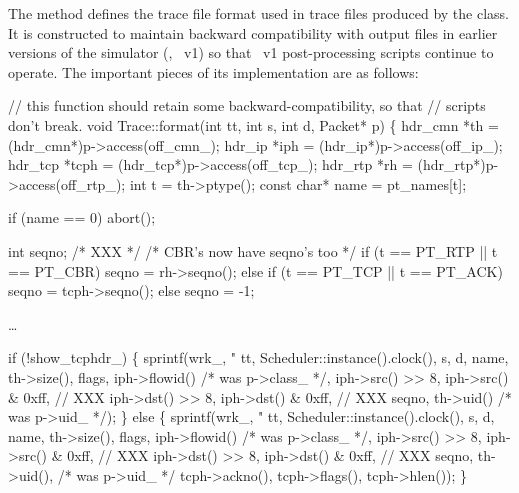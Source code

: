 The  method defines the trace file format used
in trace files produced by the  class.
It is constructed to maintain backward compatibility with output files
in earlier versions of the simulator (\ie, \ns~v1) so that \ns~v1
post-processing scripts continue to operate.
The important pieces of its implementation are as follows:
\begin{program}
        // {\cf this function should retain some backward-compatibility, so that}
        // {\cf scripts don't break.}
        void Trace::format(int tt, int s, int d, Packet* p)
        \{
                hdr_cmn *th = (hdr_cmn*)p->access(off_cmn_);
                hdr_ip *iph = (hdr_ip*)p->access(off_ip_);
                hdr_tcp *tcph = (hdr_tcp*)p->access(off_tcp_);
                hdr_rtp *rh = (hdr_rtp*)p->access(off_rtp_);
                int t = th->ptype();
                const char* name = pt_names[t];

                if (name == 0)
                        abort();

                int seqno;
                /* XXX */
                /* {\cf CBR's now have seqno's too} */
                if (t == PT_RTP || t == PT_CBR)
                        seqno = rh->seqno();
                else if (t == PT_TCP || t == PT_ACK)
                        seqno = tcph->seqno();
                else
                        seqno = -1;

                \ldots

                if (!show_tcphdr_) \{
                        sprintf(wrk_, "%
                                tt,
                                Scheduler::instance().clock(),
                                s,
                                d,
                                name,
                                th->size(),
                                flags,
                                iph->flowid() /* was p->class_ */,
                                iph->src() >> 8, iph->src() & 0xff,     // XXX
                                iph->dst() >> 8, iph->dst() & 0xff,     // XXX
                                seqno,
                                th->uid() /* was p->uid_ */);
                \} else \{
                        sprintf(wrk_,
                        "%
                                tt,
                                Scheduler::instance().clock(),
                                s,
                                d,
                                name,
                                th->size(),
                                flags,
                                iph->flowid() /* was p->class_ */,
                                iph->src() >> 8, iph->src() & 0xff,     // XXX
                                iph->dst() >> 8, iph->dst() & 0xff,     // XXX
                                seqno,
                                th->uid(), /* was p->uid_ */
                                tcph->ackno(),
                                tcph->flags(),
                                tcph->hlen());
                \}
\end{program}
